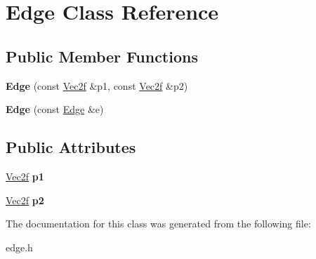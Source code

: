 \hypertarget{class_edge}{}\section{Edge Class Reference}
\label{class_edge}
\subsection*{Public Member Functions}
\begin{DoxyCompactItemize}
\item 
{\bfseries Edge} (const \hyperlink{class_vector2}{Vec2f} \&p1, const \hyperlink{class_vector2}{Vec2f} \&p2)\hypertarget{class_edge_a46424efbe9a3753f10ed69734968b42a}{}\label{class_edge_a46424efbe9a3753f10ed69734968b42a}

\item 
{\bfseries Edge} (const \hyperlink{class_edge}{Edge} \&e)\hypertarget{class_edge_a70ed9f4d5f93c9cc5273a34361781532}{}\label{class_edge_a70ed9f4d5f93c9cc5273a34361781532}

\end{DoxyCompactItemize}
\subsection*{Public Attributes}
\begin{DoxyCompactItemize}
\item 
\hyperlink{class_vector2}{Vec2f} {\bfseries p1}\hypertarget{class_edge_a52f5f3c82f0241458a80008649cf2669}{}\label{class_edge_a52f5f3c82f0241458a80008649cf2669}

\item 
\hyperlink{class_vector2}{Vec2f} {\bfseries p2}\hypertarget{class_edge_a1f8d9abda73daf83db1780825ae0be0c}{}\label{class_edge_a1f8d9abda73daf83db1780825ae0be0c}

\end{DoxyCompactItemize}


The documentation for this class was generated from the following file\+:\begin{DoxyCompactItemize}
\item 
edge.\+h\end{DoxyCompactItemize}
